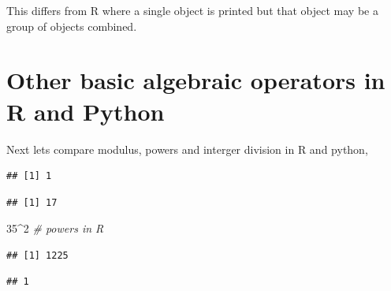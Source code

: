 \documentclass[]{book}
\newenvironment{Shaded}{\begin{snugshade}}{\end{snugshade}}
\newcommand{\DecValTok}[1]{\textcolor[rgb]{0.00,0.00,0.81}{#1}}
\newcommand{\StringTok}[1]{\textcolor[rgb]{0.31,0.60,0.02}{#1}}
\newcommand{\CommentTok}[1]{\textcolor[rgb]{0.56,0.35,0.01}{\textit{#1}}}
\newcommand{\OperatorTok}[1]{\textcolor[rgb]{0.81,0.36,0.00}{\textbf{#1}}}
\newcommand{\BuiltInTok}[1]{#1}
\newcommand{\NormalTok}[1]{#1}
\theoremstyle{definition}
\theoremstyle{definition}
\theoremstyle{definition}
\theoremstyle{remark}
\begin{document}
This differs from R where a single object is printed but that object may
be a group of objects combined.

\section{Other basic algebraic operators in R and
Python}\label{other-basic-algebraic-operators-in-r-and-python}

 Next lets compare modulus, powers and interger division
in R and python,

\begin{Shaded}
\end{Shaded}

\begin{verbatim}
## [1] 1
\end{verbatim}

\begin{Shaded}
\end{Shaded}

\begin{verbatim}
## [1] 17
\end{verbatim}

\begin{Shaded}
\begin{Highlighting}[]
\DecValTok{35}\OperatorTok{^}\DecValTok{2}        \CommentTok{# powers in R}
\end{Highlighting}
\end{Shaded}

\begin{verbatim}
## [1] 1225
\end{verbatim}

\begin{Shaded}
\end{Shaded}

\begin{verbatim}
## 1
\end{verbatim}
\end{document}
